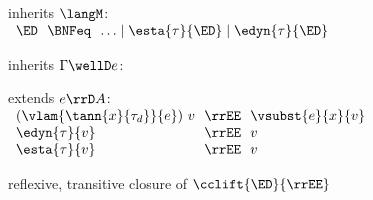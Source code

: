 \begin{flushleft}

 inherits $\langM$:\\
$\begin{array}{l@{~~}c@{~~}l}
  \ED & \BNFeq & \ldots \mid \esta{\tau}{\ED} \mid \edyn{\tau}{\ED}
\end{array}$

\smallskip
{} inherits $\Gamma \wellD e$:
\begin{mathpar}


\end{mathpar}

\smallskip
{} extends $e \rrD A$:\\
$\begin{array}{l@{~~}c@{~~}l}
  (\vlam{\tann{x}{\tau_d}}{e})~v & \rrEE & \vsubst{e}{x}{v}
\\
  \edyn{\tau}{v} & \rrEE & v
\\
  \esta{\tau}{v} & \rrEE & v
\end{array}$

\smallskip
{} reflexive, transitive closure of $\cclift{\ED}{\rrEE}$

\end{flushleft}

